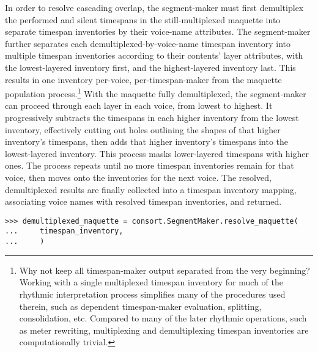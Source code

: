 \noindent In order to resolve cascading overlap, the segment-maker must first
demultiplex the performed and silent timespans in the still-multiplexed
maquette into separate timespan inventories by their voice-name attributes. The
segment-maker further separates each demultiplexed-by-voice-name timespan
inventory into multiple timespan inventories according to their contents' layer
attributes, with the lowest-layered inventory first, and the highest-layered
inventory last. This results in one inventory per-voice, per-timespan-maker
from the maquette population process.\footnote{Why not keep all timespan-maker
output separated from the very beginning? Working with a single multiplexed
timespan inventory for much of the rhythmic interpretation process simplifies
many of the procedures used therein, such as dependent timespan-maker
evaluation, splitting, consolidation, etc. Compared to many of the later
rhythmic operations, such as meter rewriting, multiplexing and demultiplexing
timespan inventories are computationally trivial.} With the maquette fully
demultiplexed, the segment-maker can proceed through each layer in each voice,
from lowest to highest. It progressively subtracts the timespans in each higher
inventory from the lowest inventory, effectively cutting out holes outlining
the shapes of that higher inventory's timespans, then adds that higher
inventory's timespans into the lowest-layered inventory. This process masks
lower-layered timespans with higher ones. The process repeats until no more
timespan inventories remain for that voice, then moves onto the inventories for
the next voice. The resolved, demultiplexed results are finally collected into
a timespan inventory mapping, associating voice names with resolved timespan
inventories, and returned.

\begin{comment}
<abjad>
demultiplexed_maquette = consort.SegmentMaker.resolve_maquette(
    timespan_inventory,
    )
</abjad>
\end{comment}

\begin{abjadbookoutput}
\begin{singlespacing}
\vspace{-0.5\baselineskip}
\begin{verbatim}
>>> demultiplexed_maquette = consort.SegmentMaker.resolve_maquette(
...     timespan_inventory,
...     )
\end{verbatim}
\end{singlespacing}
\end{abjadbookoutput}

